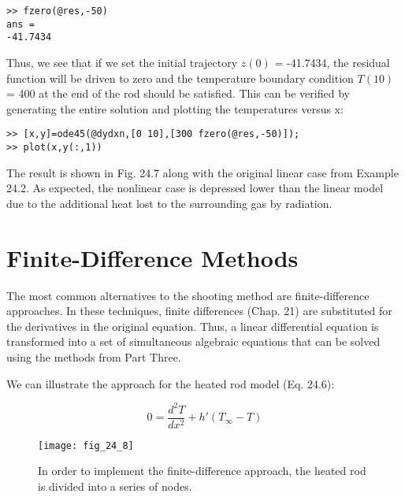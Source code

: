 \documentclass[../main.tex]{subfiles}
\begin{document}
\begin{exmp}
    \noindent\texttt{>> fzero(@res,-50)}\vspace{\medskipamount}\\
    \texttt{ans =\\
    \hspace*{\smallskipamount} -41.7434}

    \noindent Thus, we see that if we set the initial trajectory $z(0)$ = -41.7434, the residual function will
    be driven to zero and the temperature boundary condition $T(10)$ = 400 at the end of the
    rod should be satisfied. This can be verified by generating the entire solution and plotting
    the temperatures versus x:\vspace*{\smallskipamount}

    \noindent\texttt{>> [x,y]=ode45(@dydxn,[0 10],[300 fzero(@res,-50)]);\\
    >> plot(x,y(:,1))}\vspace*{\smallskipamount}

    The result is shown in Fig. 24.7 along with the original linear case from Example 24.2.
    As expected, the nonlinear case is depressed lower than the linear model due to the additional heat lost to the surrounding gas by radiation.
\end{exmp}\vspace{2cm}

\section{Finite-Difference Methods}
\noindent The most common alternatives to the shooting method are finite-difference approaches. In
these techniques, finite differences (Chap. 21) are substituted for the derivatives in the
original equation. Thus, a linear differential equation is transformed into a set of simultaneous algebraic equations that can be solved using the methods from Part Three.

We can illustrate the approach for the heated rod model (Eq. 24.6):

\begin{equation}
    \tag{24.14}
    0=\frac{d^2T}{dx^2}+h'(T_\infty-T)
\end{equation}

\begin{figure}[H]
    \centering
    \texttt{[image: fig\_24\_8]}
   \caption{\textsf{In order to implement the finite-difference approach, the heated rod is divided into a series of
   nodes.}}\label{fig:fig_24_8}
\end{figure}
\end{document}
